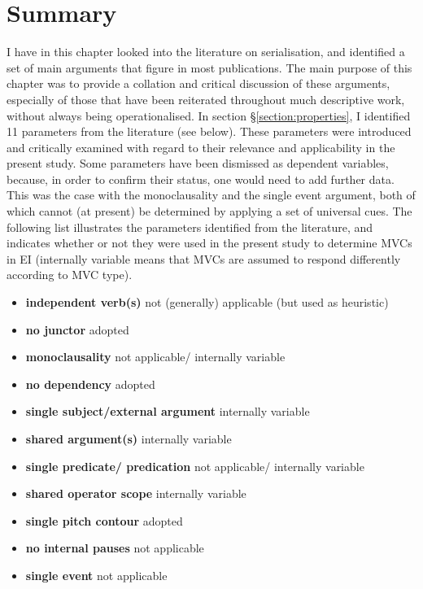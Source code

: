 \section{Summary}

I have in this chapter looked into the literature on serialisation, and identified a set  of main arguments that figure in most publications. The main purpose of this chapter was to provide a collation and critical discussion of these arguments, especially of those that have been reiterated throughout much descriptive work, without always being operationalised. In section §\ref{section:properties}, I identified 11 parameters from the literature (see below). These parameters were introduced and critically examined with regard to their relevance and applicability in the present study. Some parameters have been dismissed as dependent variables, because, in order to confirm their status, one would need to add further data. This was the case with the monoclausality and the single event argument, both of which cannot (at present) be determined by applying a set of universal cues. The following list illustrates the parameters identified from the literature, and indicates whether or not they were used in the present study to determine MVCs in EI (internally variable means that MVCs are assumed to respond differently according to MVC type).


\begin{itemize}
\item \textbf{independent verb(s)} not (generally) applicable (but used as heuristic)
\item \textbf{no junctor} adopted
\item \textbf{monoclausality} not applicable/ internally variable
\item \textbf{no dependency} adopted
\item \textbf{single subject/external argument} internally variable
\item \textbf{shared argument(s)} internally variable
\item \textbf{single predicate/ predication} not applicable/ internally variable
\item \textbf{shared operator scope} internally variable
\item \textbf{single pitch contour} adopted
\item \textbf{no internal pauses} not applicable
\item \textbf{single event} not applicable
\end{itemize}


